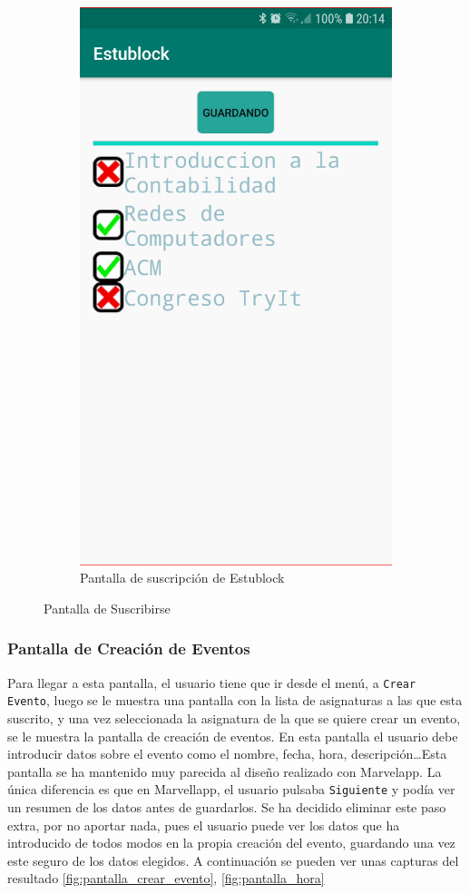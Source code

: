 \begin{figure}[hbt]
\begin{subfigure}[b]{0.4\linewidth}
        \includegraphics[width=0.7\linewidth]{figs/Desarrollo/Interfaz/estublock_asignaturas}
        \caption[Estublock Suscribirse]{Pantalla de suscripción de Estublock}
	\end{subfigure} 
	\caption[Pantalla de Suscribirse]{Pantalla de Suscribirse}
	\label{fig:pantalla_añadir_sus}
\end{figure}

\subsubsection{Pantalla de Creación de Eventos}

Para llegar a esta pantalla, el usuario tiene que ir desde el menú, a \verb|Crear Evento|, luego se le muestra una pantalla con la lista de asignaturas a las que esta suscrito, y una vez seleccionada la asignatura de la que se quiere crear un evento, se le muestra la pantalla de creación de eventos. En esta pantalla el usuario debe introducir datos sobre el evento como el nombre, fecha, hora, descripción\dots Esta pantalla se ha mantenido muy parecida al diseño realizado con Marvelapp. La única diferencia es que en Marvellapp, el usuario pulsaba \verb|Siguiente| y podía ver un resumen de los datos antes de guardarlos. Se ha decidido eliminar este paso extra, por no aportar nada, pues el usuario puede ver los datos que ha introducido de todos modos en la propia creación del evento, guardando una vez este seguro de los datos elegidos. A continuación se pueden ver unas capturas del resultado \ref{fig:pantalla_crear_evento}, \ref{fig:pantalla_hora}

